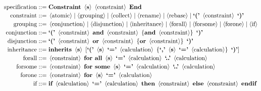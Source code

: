 \begin{minipage}{15cm}
\small
\begin{align*}
\text{spec\text{if}ication} ::= {}&\text{\bf Constraint}\ \left<\text{\bf s}\right>\ \left<\text{constraint}\right>\ \text{\bf End}\\[-1pt]
\text{constraint} ::= {}&\left<\text{\text{atomic}}\right> \mid \left<\text{grouping}\right> \mid \left<\text{\text{collect}}\right> \mid \left<\text{\text{rename}}\right> \mid \left<\text{\text{rebase}}\right> \mid \text{\bf `('}\ \left<\text{constraint}\right>\ \text{\bf `)'}\\[-1pt]
\text{grouping} ::= {}&\left<\text{conjunction}\right> \mid \left<\text{disjunction}\right> \mid \left<\text{inheritance}\right> \mid \left<\text{forall}\right> \mid \left<\text{forsome}\right> \mid \left<\text{forone}\right> \mid \left<\text{if}\right>\\[-1pt]
\text{conjunction} ::= {}&\text{\bf `('}\ \left<\text{constraint}\right>\ \text{\bf and}\ \left<\text{constraint}\right>\ \left\{ \text{\bf and}\ \left<\text{constraint}\right> \right\}\ \text{\bf `)'}\\[-1pt]
\text{disjunction} ::= {}&\text{\bf `('}\ \left<\text{constraint}\right>\ \text{\bf or}\ \left<\text{constraint}\right>\ \left\{ \text{\bf or}\ \left<\text{constraint}\right> \right\}\ \text{\bf `)'}\\[-1pt]
\text{inheritance} ::= {}&\text{\bf inherits}\ \left<\text{\bf s}\right>\ [ \text{\bf `('}\ \left<\text{\bf s}\right>\ \text{\bf `='}\ \left<\text{calculation}\right>\ \left\{ \text{\bf `,'}\ \left<\text{\bf s}\right>\ \text{\bf `='}\ \left<\text{calculation}\right> \right\}\ \text{\bf `)'} ]\\[-1pt]
\text{forall}      ::= {}&\left<\text{constraint}\right>\ \text{\bf for all}\ \left<\text{\bf s}\right>\ \text{\bf `='}\ \left<\text{calculation}\right>\ \text{\bf `..'}\ \left<\text{calculation}\right>\\[-1pt]
\text{forsome}     ::= {}&\left<\text{constraint}\right>\ \text{\bf for some}\ \left<\text{\bf s}\right>\ \text{\bf `='}\ \left<\text{calculation}\right>\ \text{\bf `..'}\ \left<\text{calculation}\right>\\[-1pt]
\text{forone}      ::= {}&\left<\text{constraint}\right>\ \text{\bf for}\ \left<\text{\bf s}\right>\ \text{\bf `='}\ \left<\text{calculation}\right>\\[-1pt]
\text{if}          ::= {}&\text{\bf if}\ \left<\text{calculation}\right>\ \text{\bf `='}\ \left<\text{calculation}\right>\ \text{\bf then}\ \left<\text{constraint}\right>\ \text{\bf else}\ \left<\text{constraint}\right>\ \text{\bf endif}\\[-1pt]

\end{align*}
\end{minipage}
